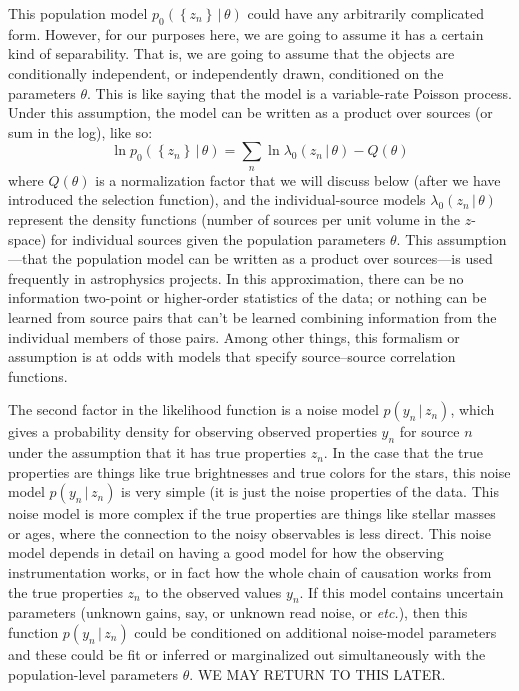 \documentclass[modern]{aastex62}
\newcommand{\given}{\,|\,}
\newcommand{\set}[1]{\left\{{#1}\right\}}
\newcommand{\foreign}[1]{\textsl{#1}}
\begin{document}
This population model $p_0(\set{z_n}\given\theta)$ could have any arbitrarily
complicated form.
However, for our purposes here, we are going to assume it has a certain kind
of separability.
That is, we are going to assume that the objects are conditionally independent,
or independently drawn, conditioned on the parameters $\theta$.
This is like saying that the model is a variable-rate Poisson process.
Under this assumption, the model can be written as a product over sources (or sum in the log), like so:
\begin{equation}
\ln p_0(\set{z_n}\given\theta) = \sum_n \ln \lambda_0(z_n\given\theta) - Q(\theta)
\end{equation}
where $Q(\theta)$ is a normalization factor that we will discuss below
(after we have introduced the selection function), and the
individual-source models $\lambda_0(z_n\given\theta)$ represent the
density functions (number of sources per unit volume in the $z$-space)
for individual sources given the population parameters $\theta$.
This assumption---that the population model can be written as a product over
sources---is used frequently in astrophysics projects.
In this approximation, there can be no information two-point or
higher-order statistics of the data; or nothing can be learned from
source pairs that can't be learned combining information from the
individual members of those pairs.
Among other things, this formalism or assumption is at odds with
models that specify source--source correlation functions.

The second factor in the likelihood function is
a noise model $p(y_n\given z_n)$, which gives a probability density for
observing observed properties $y_n$ for source $n$ under the assumption
that it has true properties $z_n$.
In the case that the true properties are things like true brightnesses
and true colors for the stars, this noise model $p(y_n\given z_n)$ is
very simple (it is just the noise properties of the data.
This noise model is more complex if the true properties are things like
stellar masses or ages, where the connection to the noisy observables is
less direct.
This noise model depends in detail on having a good model for how the
observing instrumentation works, or in fact how the whole chain of causation
works from the true properties $z_n$ to the observed values $y_n$.
If this model contains uncertain parameters (unknown gains, say, or
unknown read noise, or \foreign{etc.}), then this function
$p(y_n\given z_n)$ could be conditioned on additional noise-model
parameters and these could be fit or inferred or marginalized out
simultaneously with the population-level parameters $\theta$. WE MAY
RETURN TO THIS LATER.
\end{document}
